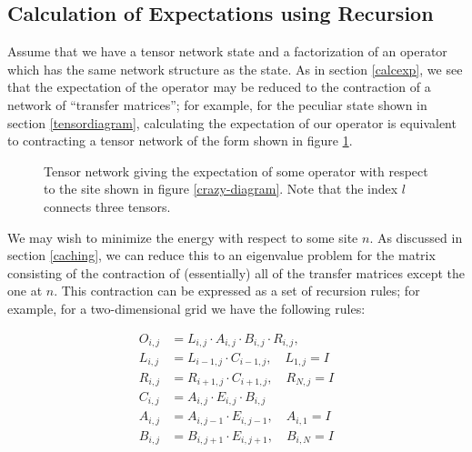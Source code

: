 \documentclass{amsbook}
\theoremstyle{plain}
\theoremstyle{definition}
\theoremstyle{remark}
\begin{document}
\subsection{Calculation of Expectations using Recursion}

Assume that we have a tensor network state and a factorization of an operator which has the same network structure as the state.  As in section \ref{calcexp}, we see that the expectation of the operator may be reduced to the contraction of a network of ``transfer matrices'';  for example, for the peculiar state shown in section \ref{tensordiagram}, calculating the expectation of our operator is equivalent to contracting a tensor network of the form shown in figure \ref{crazy-transfer-matrix-network}.

\begin{figure}
\centering
{}
\caption{\label{crazy-transfer-matrix-network} Tensor network giving the expectation of some operator with respect to the site shown in figure \ref{crazy-diagram}.  Note that the index $l$ connects three tensors.}
\end{figure}

We may wish to minimize the energy with respect to some site $n$.  As discussed in section \ref{caching}, we can reduce this to an eigenvalue problem for the matrix consisting of the contraction of (essentially) all of the transfer matrices except the one at $n$.  This contraction can be expressed as a set of recursion rules;  for example, for a two-dimensional grid we have the following rules:

$$
\begin{aligned}
O_{i,j} &= L_{i,j} \cdot A_{i,j} \cdot B_{i,j} \cdot R_{i,j}, \\
L_{i,j} &= L_{i-1,j}\cdot C_{i-1,j}, \quad L_{1,j} = I \\
R_{i,j} &= R_{i+1,j}\cdot C_{i+1,j}, \quad R_{N,j} = I \\
C_{i,j} &= A_{i,j}\cdot E_{i,j} \cdot B_{i,j} \\
A_{i,j} &= A_{i,j-1}\cdot E_{i,j-1}, \quad A_{i,1} = I \\
B_{i,j} &= B_{i,j+1}\cdot E_{i,j+1}, \quad B_{i,N} = I \\
\end{aligned}
$$
\end{document}

